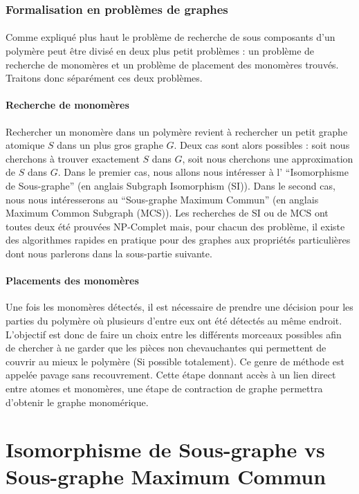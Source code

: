 \documentclass[12pt,french,twoside]{report}
\begin{document}
\subsubsection{Formalisation en problèmes de graphes}

\paragraph{}Comme expliqué plus haut le problème de recherche de sous composants d'un polymère peut être divisé en deux
plus petit problèmes : un problème de recherche de monomères et un problème de placement des monomères trouvés. Traitons
donc séparément ces deux problèmes.

\paragraph{Recherche de monomères}Rechercher un monomère dans un polymère revient à rechercher un petit graphe atomique
$S$ dans un plus gros graphe $G$. Deux cas sont alors possibles : soit nous cherchons à trouver exactement $S$ dans
$G$, soit nous cherchons une approximation de $S$ dans $G$. Dans le premier cas, nous allons nous intéresser à l'
``Isomorphisme de Sous-graphe'' (en anglais Subgraph Isomorphism (SI)). Dans le second cas, nous nous intéresserons au
``Sous-graphe Maximum Commun'' (en anglais Maximum Common Subgraph (MCS)). Les recherches de SI ou de MCS ont toutes
deux été prouvées NP-Complet mais, pour chacun des problème, il existe des algorithmes rapides en pratique pour des graphes
aux propriétés particulières dont nous parlerons dans la sous-partie suivante.

\paragraph{Placements des monomères}Une fois les monomères détectés, il est nécessaire de prendre une décision pour les parties du polymère où plusieurs d'entre eux ont été détectés au même endroit.
L'objectif est donc de faire un choix entre les différents morceaux possibles afin de chercher à ne garder que les pièces non chevauchantes qui permettent de couvrir au mieux le polymère (Si possible totalement).
Ce genre de méthode est appelée pavage sans recouvrement.
Cette étape donnant accès à un lien direct entre atomes et monomères, une étape de contraction de graphe permettra d'obtenir le graphe monomérique.




\section{Isomorphisme de Sous-graphe vs Sous-graphe Maximum Commun}
\end{document}
